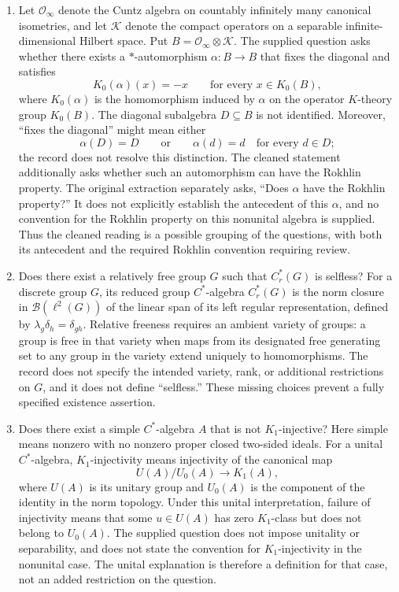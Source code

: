 \documentclass[11pt]{article}
\begin{document}
\begin{enumerate}
\item Let \(\mathcal O_\infty\) denote the Cuntz algebra on countably infinitely many canonical isometries, and let \(\mathcal K\) denote the compact operators on a separable infinite-dimensional Hilbert space. Put \(B=\mathcal O_\infty\otimes\mathcal K\). The supplied question asks whether there exists a \(*\)-automorphism \(\alpha:B\to B\) that fixes the diagonal and satisfies
\[
 K_0(\alpha)(x)=-x\qquad\text{for every }x\in K_0(B),
\]
where \(K_0(\alpha)\) is the homomorphism induced by \(\alpha\) on the operator \(K\)-theory group \(K_0(B)\). The diagonal subalgebra \(D\subseteq B\) is not identified. Moreover, ``fixes the diagonal'' might mean either
\[
 \alpha(D)=D
 \qquad\text{or}\qquad
 \alpha(d)=d\quad\text{for every }d\in D;
\]
the record does not resolve this distinction. The cleaned statement additionally asks whether such an automorphism can have the Rokhlin property. The original extraction separately asks, ``Does \(\alpha\) have the Rokhlin property?'' It does not explicitly establish the antecedent of this \(\alpha\), and no convention for the Rokhlin property on this nonunital algebra is supplied. Thus the cleaned reading is a possible grouping of the questions, with both its antecedent and the required Rokhlin convention requiring review.

\item Does there exist a relatively free group \(G\) such that \(C_r^*(G)\) is selfless? For a discrete group \(G\), its reduced group \(C^*\)-algebra \(C_r^*(G)\) is the norm closure in \(\mathcal B(\ell^2(G))\) of the linear span of its left regular representation, defined by \(\lambda_g\delta_h=\delta_{gh}\). Relative freeness requires an ambient variety of groups: a group is free in that variety when maps from its designated free generating set to any group in the variety extend uniquely to homomorphisms. The record does not specify the intended variety, rank, or additional restrictions on \(G\), and it does not define ``selfless.'' These missing choices prevent a fully specified existence assertion.

\item Does there exist a simple \(C^*\)-algebra \(A\) that is not \(K_1\)-injective? Here simple means nonzero with no nonzero proper closed two-sided ideals. For a unital \(C^*\)-algebra, \(K_1\)-injectivity means injectivity of the canonical map
\[
 U(A)/U_0(A)\longrightarrow K_1(A),
\]
where \(U(A)\) is its unitary group and \(U_0(A)\) is the component of the identity in the norm topology. Under this unital interpretation, failure of injectivity means that some \(u\in U(A)\) has zero \(K_1\)-class but does not belong to \(U_0(A)\). The supplied question does not impose unitality or separability, and does not state the convention for \(K_1\)-injectivity in the nonunital case. The unital explanation is therefore a definition for that case, not an added restriction on the question.


\end{enumerate}
\end{document}
